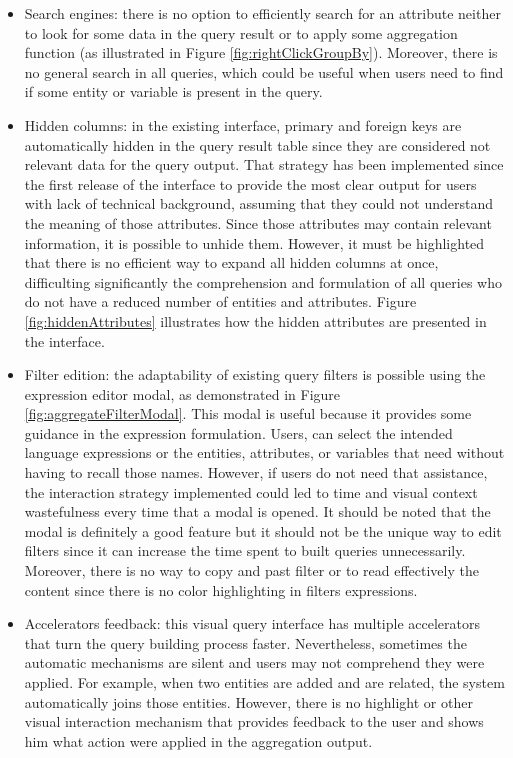 \begin{itemize}
    \item Search engines: there is no option to efficiently search for an attribute neither to look for some data in the query result or to apply some aggregation function (as illustrated in Figure \ref{fig:rightClickGroupBy}). Moreover, there is no general search in all queries, which could be useful when users need to find if some entity or variable is present in the query.
    \item Hidden columns: in the existing interface, primary and foreign keys are automatically hidden in the query result table since they are considered not relevant data for the query output. That strategy has been implemented since the first release of the interface to provide the most clear output for users with lack of technical background, assuming that they could not understand the meaning of those attributes. Since those attributes may contain relevant information, it is possible to unhide them. However, it must be highlighted that there is no efficient way to expand all hidden columns at once, difficulting significantly the comprehension and formulation of all queries who do not have a reduced number of entities and attributes. Figure \ref{fig:hiddenAttributes} illustrates how the hidden attributes are presented in the interface.
    \item Filter edition: the adaptability of existing query filters is possible using the expression editor modal, as demonstrated in Figure \ref{fig:aggregateFilterModal}. This modal is useful because it provides some guidance in the expression formulation. Users, can select the intended language expressions or the entities, attributes, or variables that need without having to recall those names. However, if users do not need that assistance, the interaction strategy implemented could led to time and visual context wastefulness every time that a modal is opened. It should be noted that the modal is definitely a good feature but it should not be the unique way to edit filters since it can increase the time spent to built queries unnecessarily. Moreover, there is no way to copy and past filter or to read effectively the content since there is no color highlighting in filters expressions.
    \item Accelerators feedback: this visual query interface has multiple accelerators that turn the query building process faster. Nevertheless, sometimes the automatic mechanisms are silent and users may not comprehend they were applied. For example, when two entities are added and are related, the system automatically joins those entities. However, there is no highlight or other visual interaction mechanism that provides feedback to the user and shows him what action were applied in the aggregation output.

\end{itemize}

